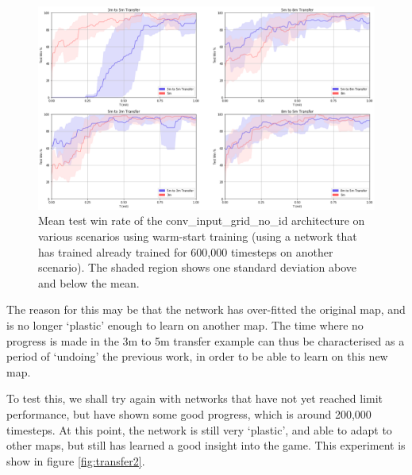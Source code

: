 \begin{figure}[h]
    \centering
    \hbox{\hspace{-5em}\includegraphics[width=1.2\textwidth]{images/graphs/6.png}}
    \caption{Mean test win rate of the conv\_input\_grid\_no\_id architecture on various scenarios using warm-start training (using a network that has trained already trained for 600,000 timesteps on another scenario). The shaded region shows one standard deviation above and below the mean.}
    \label{fig:transfer6}
\end{figure}


The reason for this may be that the network has over-fitted the original map, and is no longer `plastic' enough to learn on another map. The time where no progress is made in the 3m to 5m transfer example can thus be characterised as a period of `undoing' the previous work, in order to be able to learn on this new map.

To test this, we shall try again with networks that have not yet reached limit performance, but have shown some good progress, which is around 200,000 timesteps. At this point, the network is still very `plastic', and able to adapt to other maps, but still has learned a good insight into the game. This experiment is show in figure \ref{fig:transfer2}.


